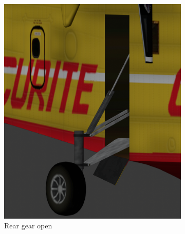 \documentclass{article}
\begin{document}
\begin{figure}[h!]
  \centering
  \begin{subfigure}[h!]{0.4\linewidth}
    \includegraphics[width=\linewidth]{postopen.png}
    \caption{Rear gear open}
  \end{subfigure}
  \begin{subfigure}[h!]{0.4\linewidth}

\end{subfigure}
\end{figure}
\end{document}
